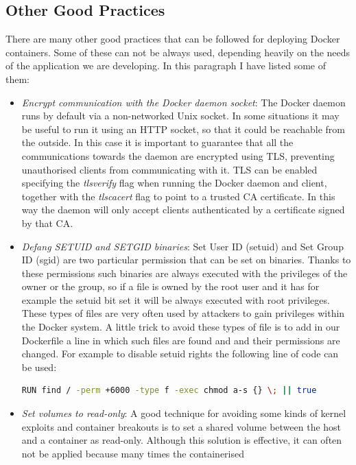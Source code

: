 \documentclass[a4paper,12pt]{article}
\begin{document}
\subsection{Other Good Practices}

There are many other good practices that can be followed for deploying Docker
containers. Some of these can not be always used, depending heavily on the needs
of the application we are developing. In this paragraph I have listed some of
them:
\begin{itemize}
  \item \textit{Encrypt communication with the Docker daemon socket}: The Docker
  daemon runs by default via a non-networked Unix socket. In some situations it
  may be useful to run it using an HTTP socket, so that it could be reachable
  from the outside. In this case it is important to guarantee that all the
  communications towards the daemon are encrypted using TLS, preventing
  unauthorised clients from communicating with it. TLS can be enabled specifying
  the \textit{tlsverify} flag when running the Docker daemon and client,
  together with the \textit{tlscacert} flag to point to a trusted CA
  certificate. In this way the daemon will only accept clients authenticated by
  a certificate signed by that CA.
  \item \textit{Defang SETUID and SETGID binaries}: Set User ID (setuid) and
  Set Group ID (sgid) are two particular permission that can be set on binaries.
  Thanks to these permissions such binaries are always executed with the
  privileges of the owner or the group, so if a file is owned by the root user
  and it has for example the setuid bit set it will be always executed with root
  privileges. These types of files are very often used by attackers to gain
  privileges within the Docker system. A little trick to avoid these types of
  file is to add in our Dockerfile a line in which such files are found and and
  their permissions are changed. For example to disable setuid rights the
  following line of code can be used:
  \begin{lstlisting}[language=bash,breaklines]
    RUN find / -perm +6000 -type f -exec chmod a-s {} \; || true
  \end{lstlisting}
  \item \textit{Set volumes to read-only}: A good technique for avoiding some
  kinds of kernel exploits and container breakouts is to set a shared volume
  between the host and a container as read-only. Although this solution is
  effective, it can often not be applied because many times the containerised

\end{itemize}
\end{document}
